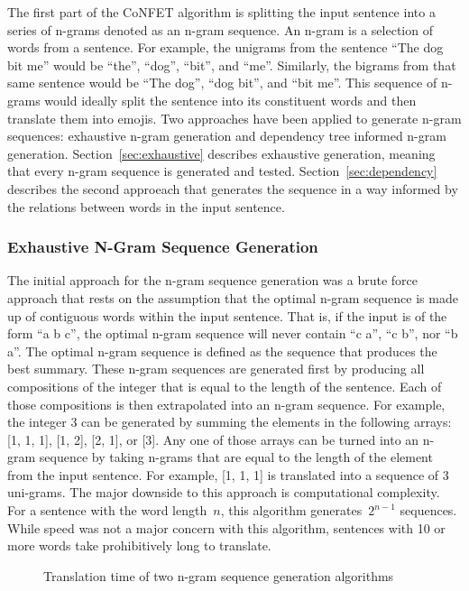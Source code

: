 \documentclass{article}[10]
\begin{document}
The first part of the CoNFET algorithm is splitting the input sentence into a series of n-grams denoted as an n-gram sequence. An n-gram is a selection of words from a sentence. For example, the unigrams from the sentence ``The dog bit me'' would be ``the'', ``dog'', ``bit'', and ``me''. Similarly, the bigrams from that same sentence would be ``The dog'', ``dog bit'', and ``bit me''. This sequence of n-grams would ideally split the sentence into its constituent words and then translate them into emojis. Two approaches have been applied to generate n-gram sequences: exhaustive n-gram generation and dependency tree informed n-gram generation. Section~\ref{sec:exhaustive} describes exhaustive generation, meaning that every n-gram sequence is generated and tested. Section~\ref{sec:dependency} describes the second approeach that generates the sequence in a way informed by the relations between words in the input sentence.

\subsubsection{Exhaustive N-Gram Sequence Generation\label{sec:exhaustive}}

The initial approach for the n-gram sequence generation was a brute force approach that rests on the assumption that the optimal n-gram sequence is made up of contiguous words within the input sentence. That is, if the input is of the form ``a b c'', the optimal n-gram sequence will never contain ``c a'', ``c b'', nor ``b a''. The optimal n-gram sequence is defined as the sequence that produces the best summary. These n-gram sequences are generated first by producing all compositions of the integer that is equal to the length of the sentence. Each of those compositions is then extrapolated into an n-gram sequence. For example, the integer 3 can be generated by summing the elements in the following arrays: [1, 1, 1], [1, 2], [2, 1], or [3]. Any one of those arrays can be turned into an n-gram sequence by taking n-grams that are equal to the length of the element from the input sentence. For example, [1, 1, 1] is translated into a sequence of 3 uni-grams. The major downside to this approach is computational complexity. For a sentence with the word length~\(n\), this algorithm generates~\(2^{n-1}\) sequences. While speed was not a major concern with this algorithm, sentences with 10 or more words take prohibitively long to translate.

\begin{figure}[h]
  \begin{center}
    \scalebox{0.6}{}
    \caption{Translation time of two n-gram sequence generation
      algorithms\label{fig:timing}}
  \end{center}
\end{figure}
\end{document}

